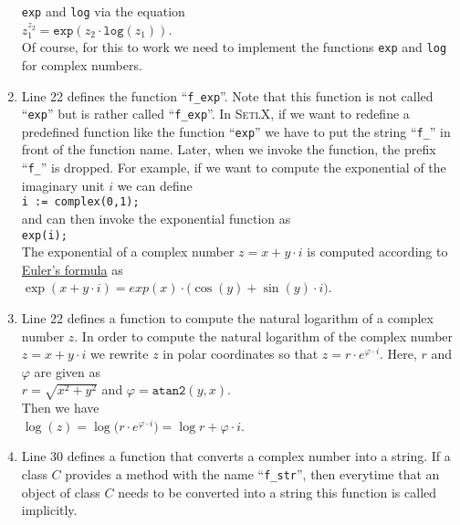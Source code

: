 \begin{enumerate}
      \texttt{exp} and \texttt{log} via the equation
      \\[0.2cm]
      \hspace*{1.3cm}
      $z_1^{z_2} = \mathtt{exp}(z_2 \cdot \mathtt{log}(z_1))$.
      \\[0.2cm]
      Of course, for this to work we need to implement the functions \texttt{exp} and
      \texttt{log} for complex numbers.
\item Line 22 defines the function ``\texttt{f\_exp}''.  Note that this function is not
      called ``\texttt{exp}'' but is rather called ``\texttt{f\_exp}''.  In
      \textsc{SetlX}, if we want to redefine a predefined function like the function
      ``\texttt{exp}'' we have to put the string ``\texttt{f\_}'' in front of the function
      name.  Later, when we invoke the function, the prefix ``\texttt{f\_}'' is dropped.
      For example, if we want to compute the exponential of the imaginary unit $i$ we can
      define
      \\[0.2cm]
      \hspace*{1.3cm}
      \texttt{i := complex(0,1);}
      \\[0.2cm]
      and can then invoke the exponential function as
      \\[0.2cm]
      \hspace*{1.3cm}
      \texttt{exp(i);}
      \\[0.2cm]
      The exponential of a complex number $z = x + y \cdot i$ is computed according to
      \href{http://en.wikipedia.org/wiki/Euler%27s_formula}{Euler's formula} as
      \\[0.2cm]
      \hspace*{1.3cm}
      $\exp(x + y \cdot i) = exp(x) \cdot \bigl(\cos(y) + \sin(y) \cdot i\bigr)$.
\item Line 22 defines a function to compute the natural logarithm of a complex number $z$.
      In order to compute the natural logarithm of the complex number $z = x + y \cdot i$ we rewrite $z$
      in polar coordinates so that $z = r \cdot e^{\varphi \cdot i}$.   Here, $r$ and
      $\varphi$ are given as
      \\[0.2cm]
      \hspace*{1.3cm}
      $r = \sqrt{x^2 + y^2}$ \quad and \quad $\varphi = \mathtt{atan2}(y, x)$.
      \\[0.2cm]
      Then we have
      \\[0.2cm]
      \hspace*{1.3cm}
      $\log(z) = \log\bigl(r \cdot e^{\varphi \cdot i}\bigr) = \log r + \varphi \cdot i$.
\item Line 30 defines a function that converts a complex number into a string.  If a class
      $C$ provides a method with the name ``\texttt{f\_str}'', then everytime that an object
      of class $C$ needs to be converted into a string this function is called implicitly.


\end{enumerate}
